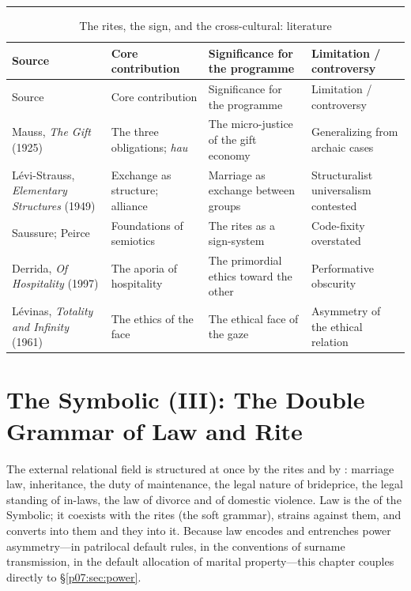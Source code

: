 \documentclass[11pt,a4paper]{article}
\newcommand{\emb}[1]{\textcolor{rose}{\oldtextbf{#1}}}
\newcommand{\goldrule}{\noindent\textcolor{gold}{\rule{\linewidth}{0.6pt}}\par\vspace{0.4em}}
\newcommand{\xref}[1]{\textcolor{rose}{\S\ref{#1}}}
\begin{document}
\goldrule
\footnotesize
\begin{longtable}{Y Y Y Y}
\caption{The rites, the sign, and the cross-cultural: literature}\label{p07:tab:rite}\\
\toprule
{}
Source & Core contribution & Significance for the programme & Limitation / controversy \\
\midrule
\endfirsthead
\toprule
{}
Source & Core contribution & Significance for the programme & Limitation / controversy \\
\midrule
\endhead
Mauss, \emph{The Gift} (1925) & The three obligations; \emph{hau} & The micro-justice of the gift economy & Generalizing from archaic cases \\
Lévi-Strauss, \emph{Elementary Structures} (1949) & Exchange as structure; alliance & Marriage as exchange between groups & Structuralist universalism contested \\
Saussure; Peirce & Foundations of semiotics & The rites as a sign-system & Code-fixity overstated \\
Derrida, \emph{Of Hospitality} (1997) & The aporia of hospitality & The primordial ethics toward the other & Performative obscurity \\
Lévinas, \emph{Totality and Infinity} (1961) & The ethics of the face & The ethical face of the gaze & Asymmetry of the ethical relation \\
\bottomrule
\end{longtable}

\section{The Symbolic (III): The Double Grammar of Law and Rite}\label{p07:sec:law}

The external relational field is structured at once by the rites and by \emb{formal law}: marriage law, inheritance, the duty of maintenance, the legal nature of brideprice, the legal standing of in-laws, the law of divorce and of domestic violence. Law is the \emb{hard grammar} of the Symbolic; it coexists with the rites (the soft grammar), strains against them, and converts into them and they into it. Because law encodes and entrenches power asymmetry---in patrilocal default rules, in the conventions of surname transmission, in the default allocation of marital property---this chapter couples directly to \xref{p07:sec:power}.
\end{document}
